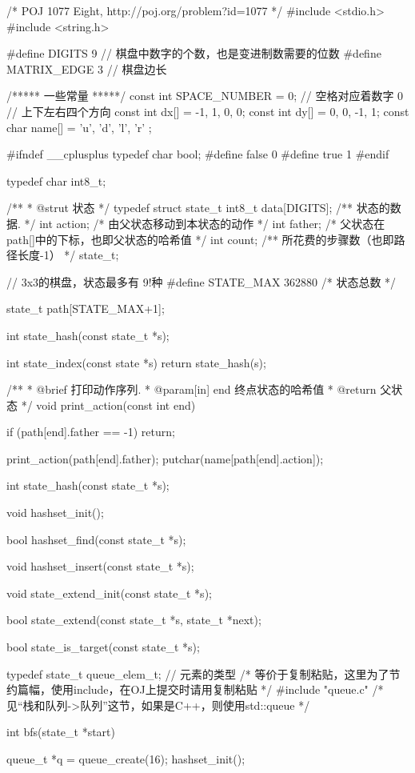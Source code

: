 \begin{Codex}[label=eight_digits_bfs.c]
/* POJ 1077 Eight, http://poj.org/problem?id=1077 */
#include <stdio.h>
#include <string.h>

#define DIGITS 9 // 棋盘中数字的个数，也是变进制数需要的位数
#define     MATRIX_EDGE 3       // 棋盘边长

/***** 一些常量 *****/
const int SPACE_NUMBER = 0; // 空格对应着数字 0
// 上下左右四个方向
const int dx[] = {-1, 1, 0, 0};
const int dy[] = {0, 0, -1, 1};
const char name[] = { 'u', 'd', 'l', 'r' };

#ifndef __cplusplus
typedef char bool;
#define false 0
#define true 1
#endif

typedef char int8_t;

/**
 * @strut 状态
 */
typedef struct state_t {
    int8_t data[DIGITS];  /** 状态的数据. */
    int action; /* 由父状态移动到本状态的动作 */
    int father; /* 父状态在path[]中的下标，也即父状态的哈希值 */
    int count;  /** 所花费的步骤数（也即路径长度-1） */
} state_t;

// 3x3的棋盘，状态最多有 9!种
#define STATE_MAX 362880  /* 状态总数 */

state_t path[STATE_MAX+1];

int state_hash(const state_t *s);

int state_index(const state *s) {
    return state_hash(s);
}

/**
 * @brief 打印动作序列.
 * @param[in] end 终点状态的哈希值
 * @return 父状态
 */
void print_action(const int end) {
    if (path[end].father == -1) return;

    print_action(path[end].father);
    putchar(name[path[end].action]);
}

int state_hash(const state_t *s);

void hashset_init();

bool hashset_find(const state_t *s);

void hashset_insert(const state_t *s);

void state_extend_init(const state_t *s);

bool state_extend(const state_t *s, state_t *next);

bool state_is_target(const state_t *s);

typedef state_t queue_elem_t; // 元素的类型
/* 等价于复制粘贴，这里为了节约篇幅，使用include，在OJ上提交时请用复制粘贴 */
#include "queue.c"  /* 见“栈和队列->队列”这节，如果是C++，则使用std::queue */

int bfs(state_t *start) {
    queue_t *q = queue_create(16);
    hashset_init();

}
\end{Codex}
